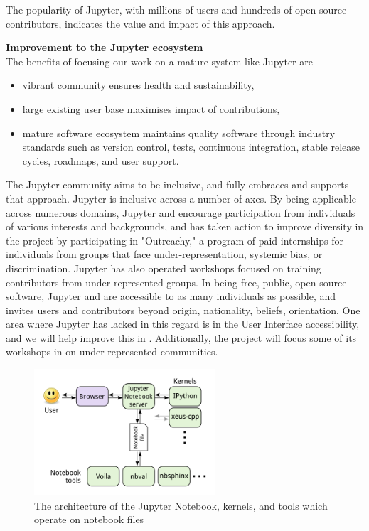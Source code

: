 The popularity of Jupyter, with millions of users and hundreds of open
source contributors, indicates the value and impact of this approach.

\medskip
\noindent\textbf{Improvement to the Jupyter ecosystem}\\
The benefits of focusing our work on a mature system like Jupyter are
\begin{itemize}
\item vibrant community ensures health and sustainability,
\item large existing user base maximises impact of contributions,
\item mature software ecosystem maintains quality software through
  industry standards such as version control, tests, continuous
  integration, stable release cycles, roadmaps, and user support.
\end{itemize}

The Jupyter community aims to be inclusive, and \TheProject fully
embraces and supports that approach.  Jupyter is inclusive across a number of axes.
By being applicable across numerous domains, Jupyter and \TheProject
encourage participation from individuals of various interests and
backgrounds, and has taken action to improve diversity in the project
by participating in "Outreachy," a program of paid internships for
individuals from groups that face under-representation, systemic bias,
or discrimination.  Jupyter has also operated workshops focused on
training contributors from under-represented groups.  In being free,
public, open source software, Jupyter and \TheProject are accessible
to as many individuals as possible, and invites users and contributors
beyond origin, nationality, beliefs, orientation.  One area where
Jupyter has lacked in this regard is in the User Interface
accessibility, and we will help improve this in
.  Additionally, the project will
focus some of its workshops in  on
under-represented communities.


\begin{figure}[ht!]\centering
  \includegraphics[width=0.6\textwidth]{images/notebook_components.png}
  \caption{The architecture of the Jupyter Notebook, kernels, and tools
        which operate on notebook files}
  \label{fig:notebook-architecture}
\end{figure}



